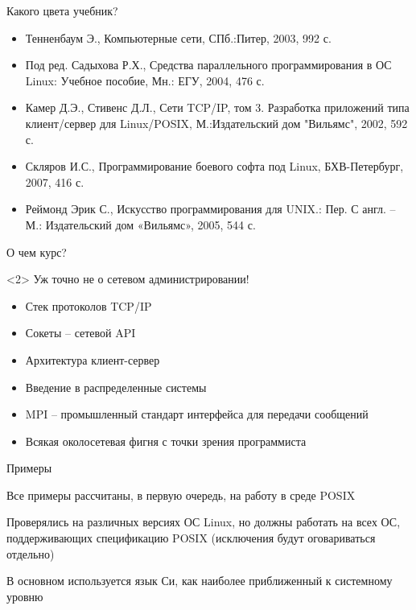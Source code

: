 \begin{frame}{Какого цвета учебник?}
	\begin{itemize}
		\item Тенненбаум Э.,  Компьютерные сети,  СПб.:Питер,  2003,  992 с.
		\item Под ред. Садыхова Р.Х.,  Средства параллельного программирования в ОС Linux: Учебное пособие,  Мн.: ЕГУ,  2004,  476 с.
		\item Камер Д.Э.,  Стивенс Д.Л.,  Сети TCP/IP,  том 3. Разработка приложений типа клиент/сервер для Linux/POSIX,  М.:Издательский дом "Вильямс",  2002,  592 с.
		\item Скляров И.С.,  Программирование боевого софта под Linux,  БХВ-Петербург,  2007,  416 с.
		\item Реймонд Эрик С.,  Искусство программирования для UNIX.: Пер. С англ. – М.: Издательский дом «Вильямс»,  2005,  544 с.
	\end{itemize}
\end{frame}



\begin{frame}{О чем курс?}
	\pause
	\begin{block}{}<2>
Уж точно не о сетевом администрировании!
	\end{block}
	\pause
	\begin{itemize}
		\item Стек протоколов TCP/IP
			\pause
		\item Сокеты -- сетевой API
			\pause
		\item Архитектура клиент-сервер
			\pause
		\item Введение в распределенные системы
			\pause
		\item MPI -- промышленный стандарт интерфейса для передачи сообщений
			\pause
		\item Всякая околосетевая фигня с точки зрения программиста
	\end{itemize}
\end{frame}

\begin{frame}{Примеры}
\begin{center}
	Все примеры рассчитаны, в первую очередь, на работу в среде POSIX
\par
	Проверялись на различных версиях ОС Linux, но должны работать на всех ОС, поддерживающих спецификацию POSIX (исключения будут оговариваться отдельно)
\par	
	В основном используется язык Си, как наиболее приближенный к системному уровню
\end{center}
\end{frame}

